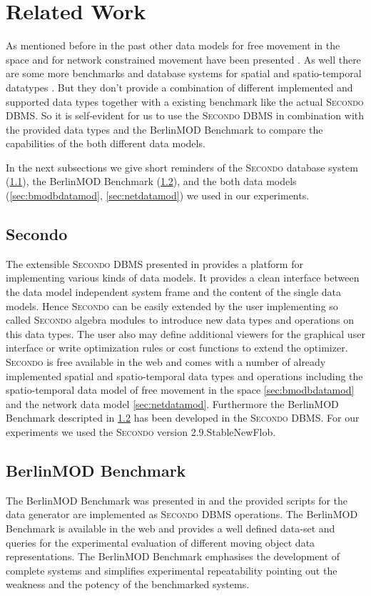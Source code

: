 \documentclass[a4paper]{article}
\newcommand{\secondo}{\textsc{Secondo}}
\newcommand{\bmodb} {BerlinMOD Benchmark}
\newcommand{\secver}{2.9.StableNewFlob}
\begin{document}
\section{Related Work}
\label{sec:relWork}
As mentioned before in the past other data models for free movement in the space \cite{335426,chenzaniolosqlst} and for network constrained movement have been
presented \cite{1146465,956692,VazWolfNetMod}. As well there are some more
benchmarks \cite{COSTBenchmark, QueriesTheodoridis} and database systems for
spatial and spatio-temporal datatypes \cite{HERMES,1054151}. But they don't
provide a combination of different implemented and supported data types together
 with a existing benchmark like the actual \secondo{} DBMS. So it is self-evident
for us to use the \secondo{} DBMS in combination with the provided data types and
the \bmodb{} to compare the capabilities of the both different data models.

In the next subsections we give short reminders of the \secondo{} database system (\ref{sec:secondo}), the \bmodb{} (\ref{sec:bmodb}), and the both data models (\ref{sec:bmodbdatamod}, \ref{sec:netdatamod}) we used in our experiments.
\subsection{Secondo}
\label{sec:secondo}
The extensible \secondo{} DBMS presented in \cite{686903,1054151} provides a
platform for implementing various kinds of data models. It provides a clean
interface between the data model independent system frame and the content of the
 single data models. Hence \secondo{} can be easily extended by the user
implementing so called \secondo{} algebra modules to introduce  new data types
and operations on this data types. The user also may define additional viewers
for the graphical user interface or write optimization rules or cost functions
to extend the optimizer. \secondo{} is free available in the web \cite{secondoweb}
and comes with a number of already implemented spatial and spatio-temporal data types
and operations including the spatio-temporal data model of free movement in the space \ref{sec:bmodbdatamod} and the network data model \ref{sec:netdatamod}. Furthermore the \bmodb{} descripted in \ref{sec:bmodb} has been developed in the \secondo{} DBMS.
For our experiments we used the \secondo{} version \secver{}.
\subsection{BerlinMOD Benchmark}
\label{sec:bmodb}
The \bmodb{} was presented in \cite{BerlinMODVLDB} \nocite{BerlinMOD} and the
provided scripts for the data generator are implemented as \secondo{} DBMS operations.
The \bmodb{} is available in the web \cite{berlinmodweb} and provides a well defined
data-set and queries for the experimental evaluation of different moving object
data representations. The \bmodb{} emphasises the development of complete systems
and simplifies experimental repeatability pointing out the weakness and the potency
of the benchmarked systems.
\end{document}
